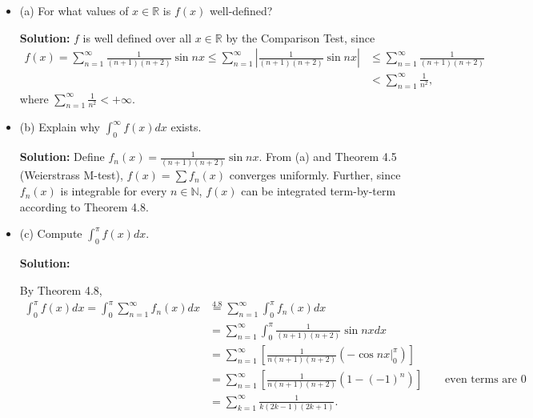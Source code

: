 \documentclass[12pt]{article}
\begin{document}
\begin{itemize}[label={},leftmargin=4mm, itemsep=1em, parsep=1em]
  \item (a) For what values of $x\in \mathbb{R}$ is $f(x)$ well-defined?

  {\bf Solution:} $f$ is well defined over all $x\in \mathbb{R}$ by the
  Comparison Test, since 
  \begin{align*}
    f(x) = \sum_{n=1}^{\infty}\frac{1}{(n+1)(n+2)}\sin nx \leq
    \sum_{n=1}^{\infty}\left|\frac{1}{(n+1)(n+2)}\sin nx\right| & \leq
  \sum_{n=1}^{\infty}\frac{1}{(n+1)(n+2)} \\
  & < \sum_{n=1}^{\infty}\frac{1}{n^{2}},
  \end{align*}
  where $\sum_{n=1}^{\infty}\frac{1}{n^{2}} < +\infty$.

  \item (b) Explain why $\int_{0}^{\infty}f(x)dx$ exists.

  {\bf Solution:} Define $f_{n}(x) = \frac{1}{(n+1)(n+2)}\sin nx$. From (a) and Theorem 4.5 (Weierstrass M-test),
  $f(x) = \sum f_{n}(x)$ converges uniformly. Further, since $f_{n}(x)$ is
  integrable for every $n \in \mathbb{N}$, $f(x)$ can be integrated term-by-term
  according to Theorem 4.8.

  \item (c) Compute $\int_{0}^{\pi}f(x)dx$.
  
  {\bf Solution:}

  By Theorem 4.8,
  \begin{align*}
    \int_{0}^{\pi}f(x)dx = \int_{0}^{\pi}\sum_{n=1}^{\infty}f_{n}(x)dx &
    \stackrel{4.8}{=}
    \sum_{n=1}^{\infty}\int_{0}^{\pi}f_{n}(x)dx \\
    & = \sum_{n=1}^{\infty}\int_{0}^{\pi}\frac{1}{(n+1)(n+2)}\sin nx dx \\
    & = \sum_{n=1}^{\infty}\left[ \frac{1}{n(n+1)(n+2)}\left(-\cos nx
    \bigg|_{0}^{\pi}\right)\right] \\
    & = \sum_{n=1}^{\infty}\left[ \frac{1}{n(n+1)(n+2)}\left(1 -
    (-1)^{n}\right)\right] \qquad \text{even terms are 0} \\
    & = \sum_{k=1}^{\infty}\frac{1}{k(2k-1)(2k+1)}.
  \end{align*}
\end{itemize}
\end{document}
